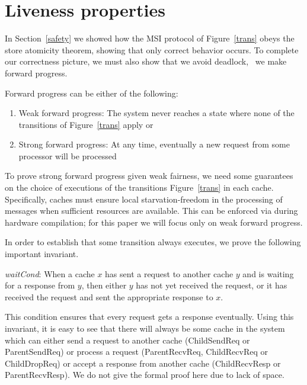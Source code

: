 \section{Liveness properties}
\label{liveness}

In Section~\ref{safety} we showed how the MSI protocol of
Figure~\ref{trans} obeys the store atomicity theorem, showing that
only correct behavior occurs. To complete our correctness picture, we
must also show that we avoid deadlock, \ie\ we make forward progress.

Forward progress can be either of the following:
\begin{enumerate}
\item Weak forward progress: The system never reaches a state where
  none of the transitions of Figure~\ref{trans} apply or
\item Strong forward progress: At any time, eventually a new request
  from some processor will be processed
\end{enumerate}

To prove strong forward progress given weak fairness, we need some
guarantees on the choice of executions of the transitions
Figure~\ref{trans} in each cache. Specifically, caches must ensure
local starvation-freedom in the processing of messages when sufficient
resources are available. This can be enforced via during hardware
compilation; for this paper we will focus only on weak forward
progress.

In order to establish that some transition always executes, we prove the
following important invariant.

\begin{inv}
\textit{waitCond}: When a cache $x$ has sent a request to another cache $y$ and
is waiting for a response from $y$, then either $y$ has not yet received the
request, or it has received the request and sent the appropriate response to
$x$.
\end{inv}

This condition ensures that every request gets a response eventually. Using
this invariant, it is easy to see that there will always be some cache in the
system which can either send a request to another cache (ChildSendReq or
ParentSendReq) or process a request (ParentRecvReq, ChildRecvReq or
ChildDropReq) or accept a response from another cache (ChildRecvResp or
ParentRecvResp). We do not give the formal proof here due to lack of space.
